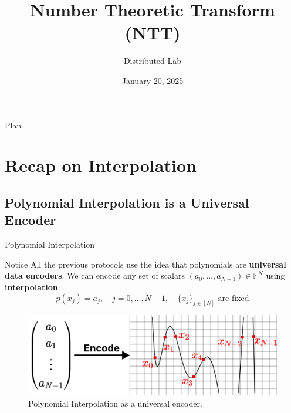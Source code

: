 \documentclass{zkdl-presentation-template}
\title[NNT. PlonK]{\textbf{Number Theoretic Transform (NTT)}}
\author{Distributed Lab}
\date{January 20, 2025}
\begin{document}

    \begin{frame}{Plan}
        \tableofcontents
    \end{frame}

    \section{Recap on Interpolation}

    \subsection{Polynomial Interpolation is a Universal Encoder}
    \begin{frame}{Polynomial Interpolation}
        \begin{block}{Notice}
            All the previous protocols use the idea that polynomials 
            are \textbf{universal data encoders}. We can encode any 
            set of scalars $(a_0,\dots,a_{N-1}) \in \mathbb{F}^N$ 
            using \textbf{interpolation}:
            \begin{equation*}
                p(x_j) = a_j, \quad j = 0,\dots,N-1, \quad \text{$\{x_j\}_{j \in [N]}$ are fixed}
            \end{equation*}
        \end{block}

        \begin{figure}
            \centering
            \includegraphics[width=\textwidth]{images/lecture_13/encoding.pdf}
            \caption{Polynomial Interpolation as a universal encoder.}
        \end{figure}        
    \end{frame}
\end{document}
